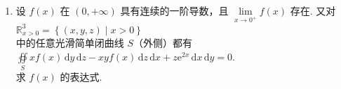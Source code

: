 \documentclass[11pt, a4paper]{article}
\begin{document}
\begin{enumerate}
\begin{enumerate}[label=(\arabic*)]
                若在 $\Omega$ 的任意子区域 $\Omega_1$ 上均有 $\displaystyle \iiint\limits_{\Omega_1} f(x,y,z) \,\mathrm dx\,\mathrm dy\,\mathrm dz=0$，证明 $f(x,y,z)\equiv 0, (x,y,z) \in \Omega$.
            \item 设 $f(x)$ 在 $(0, +\infty)$ 具有连续的一阶导数，且 $\lim\limits_{x \to 0^+} f(x)$ 存在. 又对 $\mathbb{R}^3_{x>0}=\left\{(x,y,z) \;\Big|\; x>0\right\}$ \\[0.6em]
                中的任意光滑简单闭曲线 $S$（外侧）都有 $\displaystyle \oiint\limits_S xf(x)\,\mathrm dy\,\mathrm dz-xyf(x)\,\mathrm dz\,\mathrm dx+z\mathrm e^{2x}\,\mathrm dx\,\mathrm dy=0$. \\[0.6em]
                求 $f(x)$ 的表达式.
        \end{enumerate}
 \end{enumerate}
\end{document}
